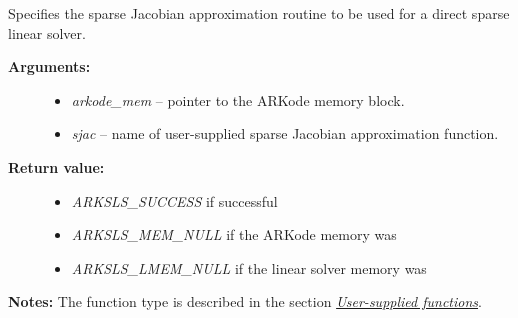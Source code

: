 \documentclass[letterpaper,10pt,english]{sphinxmanual}
\begin{document}
\begin{fulllineitems}
\label{c_interface/User_callable:ARKSlsSetSparseJacFn}
Specifies the sparse Jacobian approximation routine to
be used for a direct sparse linear solver.
\begin{description}
\item[{\textbf{Arguments:}}] \leavevmode\begin{itemize}
\item {} 
\emph{arkode\_mem} -- pointer to the ARKode memory block.

\item {} 
\emph{sjac} -- name of user-supplied sparse Jacobian approximation function.

\end{itemize}

\item[{\textbf{Return value:}}] \leavevmode\begin{itemize}
\item {} 
\emph{ARKSLS\_SUCCESS}  if successful

\item {} 
\emph{ARKSLS\_MEM\_NULL}  if the ARKode memory was 

\item {} 
\emph{ARKSLS\_LMEM\_NULL} if the linear solver memory was 

\end{itemize}

\end{description}

\textbf{Notes:} The function type {\hyperref[c_interface/User_supplied:ARKSlsSparseJacFn]{}} is
described in the section {\hyperref[c_interface/User_supplied:cinterface-usersupplied]{\emph{User-supplied functions}}}.

\end{fulllineitems}

\end{document}
